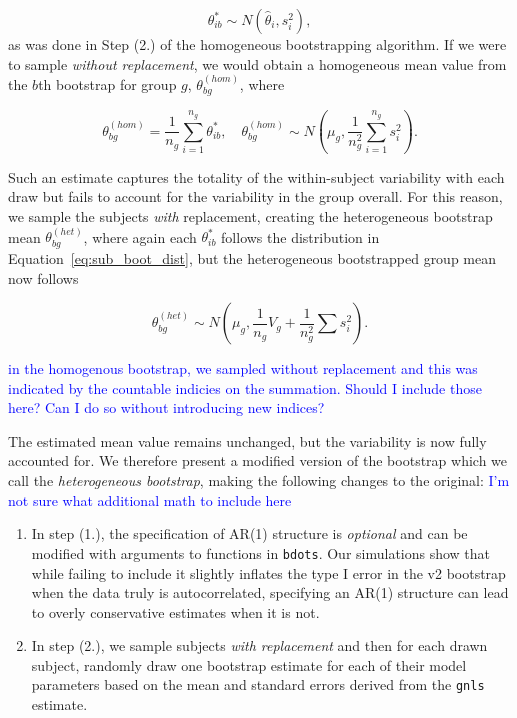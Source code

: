 \documentclass{article}
\newcommand{\xt}{\texttt}
\providecommand{\cn}[1]{\textcolor{blue}{#1}}
\begin{document}
\begin{equation}\label{eq:sub_boot_dist}
\theta^*_{ib} \sim N(\hat{\theta}_i, s_i^2),
\end{equation}
as was done in Step (2.) of the homogeneous bootstrapping algorithm. If we were to sample \textit{without replacement}, we would obtain a homogeneous mean value from the $b$th bootstrap for group $g$, $\theta^{(hom)}_{bg}$, where

\begin{equation}\label{eq:wo_rep_boot}
\theta^{(hom)}_{bg} = \frac{1}{n_g} \sum_{i=1}^{n_g} \theta^{*}_{ib}, \quad \theta^{(hom)}_{bg} \sim N \left( \mu_{g}, \frac{1}{n_g^2} \sum_{i=1}^{n_g} s_i^2 \right).
\end{equation}

Such an estimate captures the totality of the within-subject variability with each draw but fails to account for the variability in the group overall. For this reason, we sample the subjects \textit{with} replacement, creating the heterogeneous bootstrap mean $\theta_{bg}^{(het)}$, where again each $\theta_{ib}^*$ follows the distribution in Equation~\ref{eq:sub_boot_dist}, but the heterogeneous bootstrapped group mean now follows

\begin{equation}\label{eq:w_rep_boot}
\theta_{bg}^{(het)} \sim N \left( \mu_{g}, \frac{1}{n_g} V_{g} + \frac{1}{n_g^2} \sum s_i^2 \right).
\end{equation}

\cn{in the homogenous bootstrap, we sampled without replacement and this was indicated by the countable indicies on the summation. Should I include those here? Can I do so without introducing new indices?}

The estimated mean value remains unchanged, but the variability is now fully accounted for. We therefore present a modified version of the bootstrap which we call the \textit{heterogeneous bootstrap}, making the following changes to the original:  \cn{I'm not sure what additional math to include here}

\begin{enumerate}
\item In step (1.), the specification of AR(1) structure is \textit{optional} and can be modified with arguments to functions in \xt{bdots}. Our simulations show that while failing to include it slightly inflates the type I error in the v2 bootstrap when the data truly is autocorrelated, specifying an AR(1) structure can lead to overly conservative estimates when it is not.
\item In step (2.), we sample subjects \textit{with replacement} and then for each drawn subject, randomly draw one bootstrap estimate for each of their model parameters based on the mean and standard errors derived from the \xt{gnls} estimate.
\end{enumerate}
\end{document}
